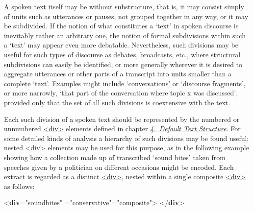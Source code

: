 A spoken text itself may be without substructure, that is, it may consist simply of units such as utterances or pauses, not grouped together in any way, or it may be subdivided. If the notion of what constitutes a ‘text’ in spoken discourse is inevitably rather an arbitrary one, the notion of formal subdivisions within such a ‘text’ may appear even more debatable. Nevertheless, such divisions may be useful for such types of discourse as debates, broadcasts, etc., where structural subdivisions can easily be identified, or more generally wherever it is desired to aggregate utterances or other parts of a transcript into units smaller than a complete ‘text’. Examples might include ‘conversations’ or ‘discourse fragments’, or more narrowly, ‘that part of the conversation where topic x was discussed’, provided only that the set of all such divisions is coextensive with the text.\par
Each such division of a spoken text should be represented by the numbered or unnumbered \hyperref[TEI.div]{<div>} elements defined in chapter \textit{\hyperref[DS]{4.\ Default Text Structure}}. For some detailed kinds of analysis a hierarchy of such divisions may be found useful; nested \hyperref[TEI.div]{<div>} elements may be used for this purpose, as in the following example showing how a collection made up of transcribed ‘sound bites’ taken from speeches given by a politician on different occasions might be encoded. Each extract is regarded as a distinct \hyperref[TEI.div]{<div>}, nested within a single composite \hyperref[TEI.div]{<div>} as follows: \par\bgroup{}\exampleFont \begin{shaded}\noindent\mbox{}{<\textbf{div}\hspace*{1em}{type}="{soundbites}"\mbox{}\newline 
\hspace*{1em}{subtype}="{conservative}"\hspace*{1em}{org}="{composite}">}\mbox{}\newline 
{}\mbox{}\newline 
{}\mbox{}\newline 
{}\mbox{}\newline 
{</\textbf{div}>}\end{shaded}\egroup\par \par
